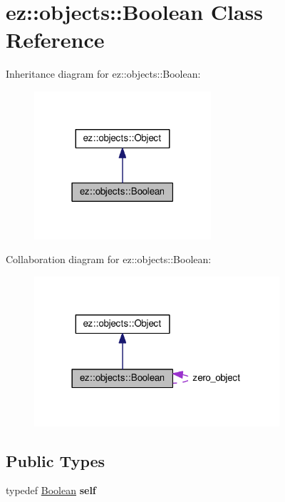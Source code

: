 \hypertarget{classez_1_1objects_1_1Boolean}{}\section{ez\+:\+:objects\+:\+:Boolean Class Reference}
\label{classez_1_1objects_1_1Boolean}


Inheritance diagram for ez\+:\+:objects\+:\+:Boolean\+:
\nopagebreak
\begin{figure}[H]
\begin{center}
\leavevmode
\includegraphics[width=186pt]{classez_1_1objects_1_1Boolean__inherit__graph}
\end{center}
\end{figure}


Collaboration diagram for ez\+:\+:objects\+:\+:Boolean\+:
\nopagebreak
\begin{figure}[H]
\begin{center}
\leavevmode
\includegraphics[width=258pt]{classez_1_1objects_1_1Boolean__coll__graph}
\end{center}
\end{figure}
\subsection*{Public Types}
\begin{DoxyCompactItemize}
\item 
\mbox{\label{classez_1_1objects_1_1Boolean_ac3651f6ce091b0d95d5dd3480731e355}} 
typedef \hyperlink{classez_1_1objects_1_1Boolean}{Boolean} {\bfseries self}
\end{DoxyCompactItemize}
